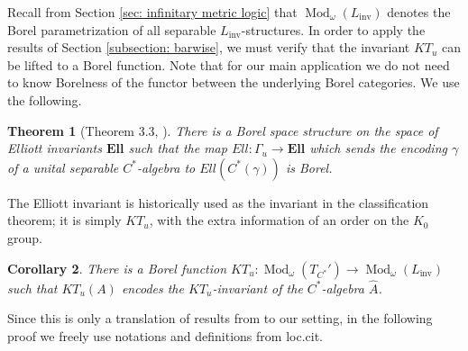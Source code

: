 \documentclass[12pt]{amsart}
\newtheorem{theorem}{Theorem}[section]
\newtheorem{corollary}[theorem]{Corollary}
\DeclareMathOperator{\Mod}{Mod}
\DeclareMathOperator{\inv}{inv}
\newcommand{\Lang}{L}
\begin{document}
Recall from Section \ref{sec: infinitary metric logic} that $\Mod_\omega(\Lang_{\inv})$ denotes the Borel parametrization of all separable $\Lang_{\inv}$-structures.
In order to apply the results of Section \ref{subsection: barwise}, we must verify that the invariant $KT_u$ can be lifted to a Borel function.
Note that for our main application we do not need to know Borelness of the functor between the underlying Borel categories. We use the following.
\begin{theorem}[Theorem 3.3, \cite{farah2013descriptive}]
    There is a Borel space structure on the space of Elliott invariants $\mathbf{Ell}$ such that the map $Ell \colon \Gamma_u \rightarrow \mathbf{Ell}$ which sends the encoding $\gamma$ of a unital separable $C^*$-algebra to $Ell(C^*(\gamma))$ is Borel.
\end{theorem}
The Elliott invariant is historically used as the invariant in the classification theorem; it is simply $KT_u$, with the extra information of an order on the $K_0$ group.

\begin{corollary} \label{corollary: KT_u is a Borel invariant}
    There is a Borel function $KT_u \colon \Mod_{\omega}(T_{C^*}') \to \Mod_{\omega}(\Lang_{\inv})$ such that $KT_u(A)$ encodes the $KT_u$-invariant of the $C^*$-algebra $\widehat{A}$.
\end{corollary}

Since this is only a translation of results from \cite{farah2013descriptive, Farahturbulence2014} to our setting, in the following proof we freely use notations and definitions from loc.cit.
\end{document}
